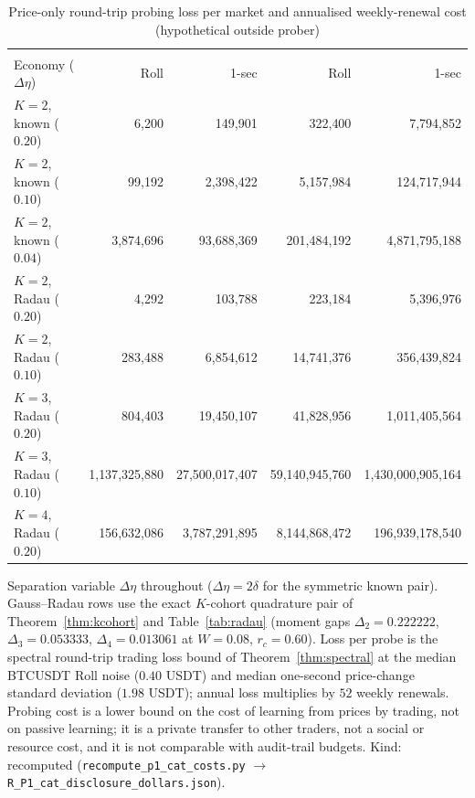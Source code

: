 \documentclass[12pt]{article}
\theoremstyle{definition}
\theoremstyle{remark}
\begin{document}
\begin{table}[t]\centering\footnotesize
\begin{threeparttable}
\caption{Price-only round-trip probing loss per market and annualised weekly-renewal cost (hypothetical outside prober)}\label{tab:cat_dollars}
\setlength{\tabcolsep}{1.5pt}
\begin{tabular}{@{}>{\scriptsize}l*{4}{>{\scriptsize}r}@{}}
\toprule
 & \multicolumn{2}{c}{\scriptsize Loss / probe (USDT)} & \multicolumn{2}{c}{\scriptsize Annual ($52\times$, USDT)}\\
Economy ($\Delta\eta$) & Roll & 1-sec & Roll & 1-sec\\
\midrule
$K=2$, known ($0.20$) & 6{,}200 & 149{,}901 & 322{,}400 & 7{,}794{,}852\\
$K=2$, known ($0.10$) & 99{,}192 & 2{,}398{,}422 & 5{,}157{,}984 & 124{,}717{,}944\\
$K=2$, known ($0.04$) & 3{,}874{,}696 & 93{,}688{,}369 & 201{,}484{,}192 & 4{,}871{,}795{,}188\\
\midrule
$K=2$, Radau ($0.20$) & 4{,}292 & 103{,}788 & 223{,}184 & 5{,}396{,}976\\
$K=2$, Radau ($0.10$) & 283{,}488 & 6{,}854{,}612 & 14{,}741{,}376 & 356{,}439{,}824\\
$K=3$, Radau ($0.20$) & 804{,}403 & 19{,}450{,}107 & 41{,}828{,}956 & 1{,}011{,}405{,}564\\
$K=3$, Radau ($0.10$) & 1{,}137{,}325{,}880 & 27{,}500{,}017{,}407 & 59{,}140{,}945{,}760 & 1{,}430{,}000{,}905{,}164\\
$K=4$, Radau ($0.20$) & 156{,}632{,}086 & 3{,}787{,}291{,}895 & 8{,}144{,}868{,}472 & 196{,}939{,}178{,}540\\
\bottomrule
\end{tabular}
\begin{tablenotes}\footnotesize\item Separation variable $\Delta\eta$ throughout ($\Delta\eta=2\delta$ for the symmetric known pair). Gauss--Radau rows use the exact $K$-cohort quadrature pair of Theorem~\ref{thm:kcohort} and Table~\ref{tab:radau} (moment gaps $\Delta_2=0.222222$, $\Delta_3=0.053333$, $\Delta_4=0.013061$ at $W=0.08$, $r_c=0.60$). Loss per probe is the spectral round-trip trading loss bound of Theorem~\ref{thm:spectral} at the median BTCUSDT Roll noise ($0.40$ USDT) and median one-second price-change standard deviation ($1.98$ USDT); annual loss multiplies by $52$ weekly renewals. Probing cost is a lower bound on the cost of learning from prices by trading, not on passive learning; it is a private transfer to other traders, not a social or resource cost, and it is not comparable with audit-trail budgets. Kind: recomputed (\texttt{recompute\_p1\_cat\_costs.py} $\to$ \texttt{R\_P1\_cat\_disclosure\_dollars.json}).\end{tablenotes}
\end{threeparttable}
\end{table}
\end{document}
